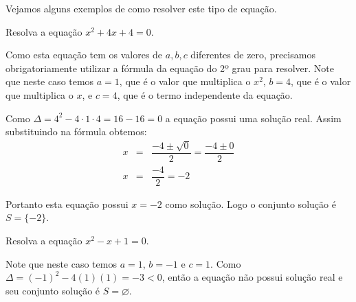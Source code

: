 

 Vejamos alguns exemplos de como resolver este tipo de equação.
 \begin{exem} 
  Resolva a equação $x^2 + 4x + 4= 0$.

 Como esta equação tem os valores de $a, b, c$ diferentes de zero, precisamos obrigatoriamente utilizar a fórmula da equação do 2º grau para resolver. Note que neste caso temos $a= 1$, que é o valor que multiplica o $x^2$, $b= 4$, que é o valor que multiplica o $x$, e $c= 4$, que é o termo independente da equação.
 
  Como $\Delta=4^2 - 4 \cdot 1 \cdot 4 = 16-16=0$ a equação possui uma solução real.  Assim substituindo na fórmula obtemos:
 \begin{eqnarray*}
 x &=& \dfrac{-4 \pm \sqrt{0}}{2}= \dfrac{-4 \pm 0}{2} \\
 x &=& \dfrac{-4}{2}= -2
 \end{eqnarray*}

 Portanto esta equação possui $x= -2$ como solução. Logo o conjunto solução é $S= \{-2\}$.
 \end{exem}
 
 \begin{exem}
 Resolva a equação $x^2 - x + 1= 0$.

 Note que neste caso temos $a= 1$, $b= -1$ e $c= 1$. Como $\Delta = (-1)^2-4(1)(1)=-3<0$, então a equação não possui solução real e seu conjunto solução é $S=\varnothing$.
\end{exem}
 


